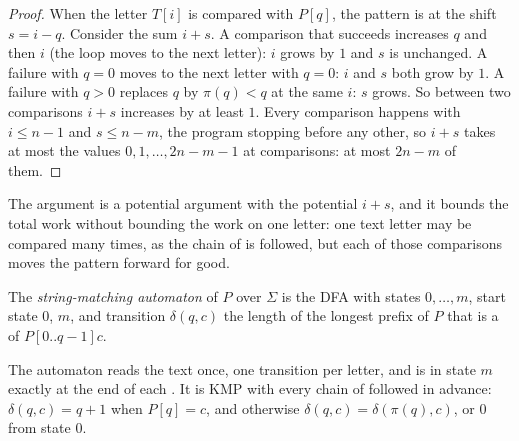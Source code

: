 \begin{proof}
When the letter $T[i]$ is compared with $P[q]$, the pattern is at the shift $s = i - q$. Consider the sum $i + s$. A
comparison that succeeds increases $q$ and then $i$ (the loop moves to the next letter): $i$ grows by $1$ and $s$ is
unchanged. A failure with $q = 0$ moves to the next letter with $q = 0$: $i$ and $s$ both grow by $1$. A failure with
$q > 0$ replaces $q$ by $\pi(q) < q$ at the same $i$: $s$ grows. So between two comparisons $i + s$ increases by at least
$1$. Every comparison happens with $i \leq n - 1$ and $s \leq n - m$, the program stopping before any other, so $i + s$
takes at most the values $0, 1, \dots, 2n - m - 1$ at comparisons: at most $2n - m$ of them.
\end{proof}

The argument is a potential argument with the potential $i + s$, and it bounds the total work without bounding the work
on one letter: one text letter may be compared many times, as the chain of  is followed, but each of those
comparisons moves the pattern forward for good.

\begin{definition}\label{def:b2:text-algorithms:automaton}
The \emph{string-matching automaton} of $P$ over $\Sigma$ is the DFA with states $0,
\dots, m$, start state $0$,  $m$, and transition $\delta(q, c)$ the length of the longest prefix of $P$
that is a  of $P[0..q-1]c$.
\end{definition}

The automaton reads the text once, one transition per letter, and is in state $m$ exactly at the end of each .
It is KMP with every chain of  followed in advance: $\delta(q, c) = q + 1$ when $P[q] = c$, and otherwise
$\delta(q, c) = \delta(\pi(q), c)$, or $0$ from state $0$.

\label{lst:b2:text-algorithms:automaton}

\label{out:b2:text-algorithms:automaton}

